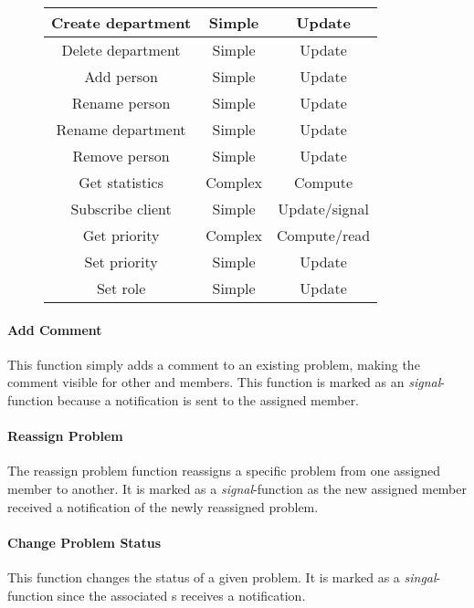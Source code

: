 \begin{figure}[h]
\begin{center}
\begin{tabular}{|c|c|c|}
Create department & Simple & Update \\ \hline%
Delete department & Simple & Update \\ \hline%
Add person & Simple & Update \\ \hline%
Rename person & Simple & Update \\ \hline%
Rename department & Simple & Update \\ \hline%
Remove person & Simple & Update \\ \hline%
Get statistics & Complex & Compute \\ \hline%
Subscribe client & Simple & Update/signal \\ \hline%
Get priority & Complex & Compute/read \\ \hline%
Set priority & Simple & Update \\ \hline%
Set role & Simple & Update \\ \hline%

\end{tabular}
\end{center}
\label{tab:functionlist}
\end{figure}


\paragraph{Add Comment} This function simply adds a comment to an existing problem, making the comment visible for other \client{} and \astaff[] members. This function is marked as an \textit{signal}-function because a notification is sent to the assigned \astaff[] member.

\paragraph{Reassign Problem} The reassign problem function reassigns a specific problem from one assigned \astaff[] member to another. It is marked as a \textit{signal}-function as the new assigned \astaff[] member received a notification of the newly reassigned problem. 

\paragraph{Change Problem Status} This function changes the status of a given problem. It is marked as a \textit{singal}-function since the associated \client s receives a notification. 

